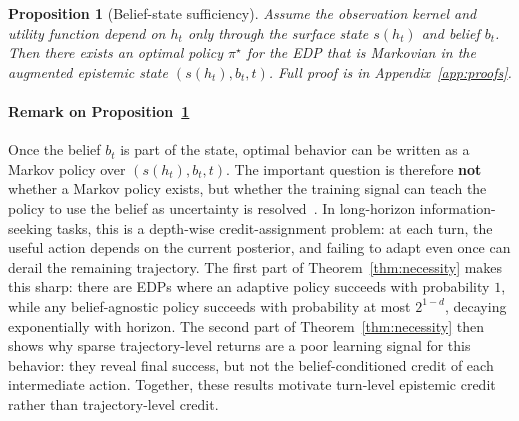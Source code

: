 \documentclass[11pt]{article}
\theoremstyle{plain}
\newtheorem{proposition}[theorem]{Proposition}
\theoremstyle{definition}
\theoremstyle{remark}
\begin{document}
\begin{theorybox}
\begin{proposition}[Belief-state sufficiency]
Assume the observation kernel and utility function depend on \(h_t\) only through the surface state \(s(h_t)\) and belief \(b_t\). Then there exists an optimal policy $\pi^\star$ for the EDP that is Markovian in the augmented epistemic state \((s(h_t),b_t,t)\). Full proof is in Appendix~\ref{app:proofs}.
\label{proposition:belief_sufficiency_main}
\end{proposition}
\end{theorybox}
\vspace{-3mm}

\paragraph{Remark on Proposition~\ref{proposition:belief_sufficiency_main}} Once the belief \(b_t\) is part of the state, optimal behavior can be written as a Markov policy over \((s(h_t),b_t,t)\). The important question is therefore \textbf{not} whether a Markov policy exists, but whether the training signal can teach the policy to use the belief as uncertainty is resolved~\citep{zhang2025markovianreflectiveexplorationbayesadaptive}. In long-horizon information-seeking tasks, this is a depth-wise credit-assignment problem: at each turn, the useful action depends on the current posterior, and failing to adapt even once can derail the remaining trajectory. The first part of Theorem~\ref{thm:necessity} makes this sharp: there are EDPs where an adaptive policy succeeds with probability \(1\), while any belief-agnostic policy succeeds with probability at most \(2^{1-d}\), decaying exponentially with horizon. The second part of Theorem~\ref{thm:necessity}  then shows why sparse trajectory-level returns are a poor learning signal for this behavior: they reveal final success, but not the belief-conditioned credit of each intermediate action. Together, these results motivate turn-level epistemic credit rather than trajectory-level credit.
\end{document}
